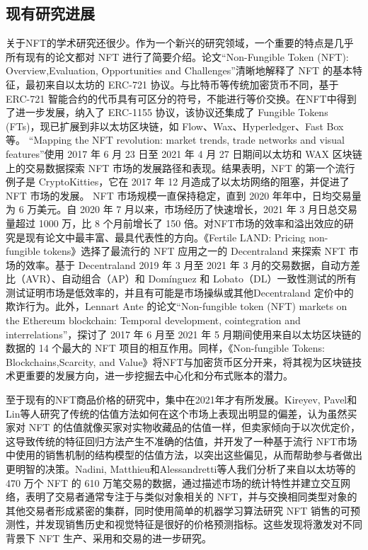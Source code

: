 \documentclass{article}
\begin{document}
\subsection{现有研究进展}
关于NFT的学术研究还很少。作为一个新兴的研究领域，一个重要的特点是几乎所有现有的论文都对 NFT 进行了简要介绍。论文“Non-Fungible Token (NFT): Overview,Evaluation, Opportunities and Challenges”清晰地解释了 NFT 的基本特征，最初来自以太坊的 ERC-721 协议\cite{wang2021non}。与比特币等传统加密货币不同，基于ERC-721 智能合约的代币具有可区分的符号，不能进行等价交换。在NFT中得到了进一步发展，纳入了 ERC-1155 协议，该协议还集成了 Fungible Tokens (FTs)，现已扩展到非以太坊区块链，如 Flow、Wax、Hyperledger、Fast Box 等。 “Mapping the NFT revolution: market trends, trade networks and visual features”\cite{nadini2021mapping}使用 2017 年 6 月 23 日至 2021 年 4 月 27 日期间以太坊和 WAX 区块链上的交易数据探索 NFT 市场的发展路径和表现。结果表明，NFT 的第一个流行例子是 CryptoKitties，它在 2017 年 12 月造成了以太坊网络的阻塞，并促进了 NFT 市场的发展。 NFT 市场规模一直保持稳定，直到 2020 年年中，日均交易量为 6 万美元。自 2020 年 7 月以来，市场经历了快速增长，2021 年 3 月日总交易量超过 1000 万，比 8 个月前增长了 150 倍。对NFT市场的效率和溢出效应的研究是现有论文中最丰富、最具代表性的方向。《Fertile LAND: Pricing non-fungible tokens》选择了最流行的 NFT 应用之一的 Decentraland 来探索 NFT 市场的效率\cite{Dowling2022Jan}。基于 Decentraland 2019 年 3 月至 2021 年 3 月的交易数据，自动方差比（AVR）、自动组合（AP）和 Domínguez 和 Lobato（DL）一致性测试的所有测试证明市场是低效率的，并且有可能是市场操纵或其他Decentraland  定价中的欺诈行为。此外，Lennart Ante 的论文“Non-fungible token (NFT) markets on the Ethereum blockchain: Temporal development, cointegration and interrelations”\cite{ante2021non}，探讨了 2017 年 6 月至 2021 年 5 月期间使用来自以太坊区块链的数据的 14 个最大的 NFT 项目的相互作用。同样，《Non-fungible Tokens: Blockchains,Scarcity, and Value》将NFT与加密货币区分开来，将其视为区块链技术更重要的发展方向，进一步挖掘去中心化和分布式账本的潜力。\cite{Fintech2021}
\par 至于现有的NFT商品价格的研究中，集中在2021年才有所发展。Kireyev, Pavel和 Lin等人\cite{kireyev2021infinite}研究了传统的估值方法如何在这个市场上表现出明显的偏差，认为虽然买家对 NFT 的估值就像买家对实物收藏品的估值一样，但卖家倾向于以次优定价，这导致传统的特征回归方法产生不准确的估值，并开发了一种基于流行 NFT市场中使用的销售机制的结构模型的估值方法，以突出这些偏见，从而帮助参与者做出更明智的决策。Nadini, Matthieu和Alessandretti等人\cite{nadini2021mapping}我们分析了来自以太坊等的470 万个 NFT 的 610 万笔交易的数据，通过描述市场的统计特性并建立交互网络，表明了交易者通常专注于与类似对象相关的 NFT，并与交换相同类型对象的其他交易者形成紧密的集群，同时使用简单的机器学习算法研究 NFT 销售的可预测性，并发现销售历史和视觉特征是很好的价格预测指标。这些发现将激发对不同背景下 NFT 生产、采用和交易的进一步研究。
\end{document}

